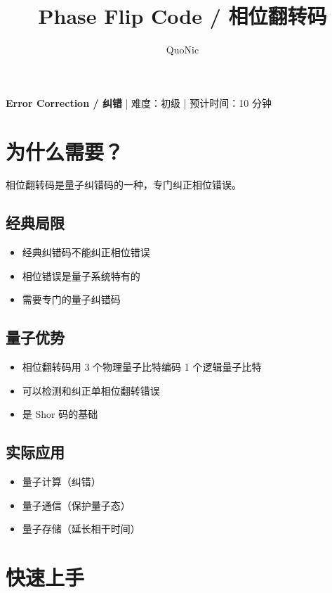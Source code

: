 \documentclass[12pt,a4paper]{article}
\title{Phase Flip Code / 相位翻转码}
\author{QuoNic}
\date{}
\begin{document}
\maketitle

\begin{center}
\textbf{Error Correction / 纠错} | 难度：初级 | 预计时间：10 分钟
\end{center}

\tableofcontents
\newpage

\section{为什么需要？}

相位翻转码是量子纠错码的一种，专门纠正相位错误。

\subsection{经典局限}
\begin{itemize}
  \item 经典纠错码不能纠正相位错误
  \item 相位错误是量子系统特有的
  \item 需要专门的量子纠错码
\end{itemize}

\subsection{量子优势}
\begin{itemize}
  \item 相位翻转码用 3 个物理量子比特编码 1 个逻辑量子比特
  \item 可以检测和纠正单相位翻转错误
  \item 是 Shor 码的基础
\end{itemize}

\subsection{实际应用}
\begin{itemize}
  \item 量子计算（纠错）
  \item 量子通信（保护量子态）
  \item 量子存储（延长相干时间）
\end{itemize}

\section{快速上手}
\end{document}
